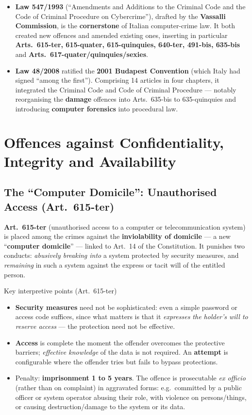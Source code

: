 \documentclass[11pt,a4paper,openany]{report}
\theoremstyle{definition}
\theoremstyle{plain}
\theoremstyle{remark}
\begin{document}
\begin{itemize}
    \item \textbf{Law 547/1993} (``Amendments and Additions to the Criminal Code and the Code of Criminal Procedure on Cybercrime''), drafted by the \textbf{Vassalli Commission}, is the \textbf{cornerstone} of Italian computer-crime law. It both created new offences and amended existing ones, inserting in particular \textbf{Arts.\ 615-ter, 615-quater, 615-quinquies, 640-ter, 491-bis, 635-bis} and \textbf{Arts.\ 617-quater/quinquies/sexies}.
    \item \textbf{Law 48/2008} ratified the \textbf{2001 Budapest Convention} (which Italy had signed ``among the first''). Comprising 14 articles in four chapters, it integrated the Criminal Code and Code of Criminal Procedure --- notably reorganising the \textbf{damage} offences into Arts.\ 635-bis to 635-quinquies and introducing \textbf{computer forensics} into procedural law.
\end{itemize}

\section{Offences against Confidentiality, Integrity and Availability}

\subsection{The ``Computer Domicile'': Unauthorised Access (Art.\ 615-ter)}

\textbf{Art.\ 615-ter} (unauthorised access to a computer or telecommunication system) is placed among the crimes against the \textbf{inviolability of domicile} --- a new ``\textbf{computer domicile}'' --- linked to Art.\ 14 of the Constitution. It punishes two conducts: \emph{abusively breaking into} a system protected by security measures, and \emph{remaining} in such a system against the express or tacit will of the entitled person.

\begin{sidebox}{Key interpretive points (Art.\ 615-ter)}
\begin{itemize}
    \item \textbf{Security measures} need not be sophisticated: even a simple password or access code suffices, since what matters is that it \emph{expresses the holder's will to reserve access} --- the protection need not be effective.
    \item \textbf{Access} is complete the moment the offender overcomes the protective barriers; \emph{effective knowledge} of the data is not required. An \textbf{attempt} is configurable where the offender tries but fails to bypass protections.
    \item Penalty: \textbf{imprisonment 1 to 5 years}. The offence is prosecutable \emph{ex officio} (rather than on complaint) in aggravated forms: e.g.\ committed by a public officer or system operator abusing their role, with violence on persons/things, or causing destruction/damage to the system or its data.
\end{itemize}
\end{sidebox}
\end{document}
